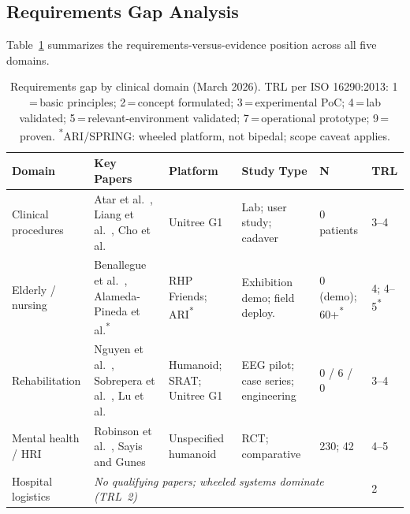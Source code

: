 \documentclass[acmsmall]{acmart}
\begin{document}
\subsection{Requirements Gap Analysis}
\label{sec:crossdomain}

Table~\ref{tab:evidence} summarizes the requirements-versus-evidence position
across all five domains.

\begin{table}[t]
  \caption{Requirements gap by clinical domain (March 2026). TRL per ISO
  16290:2013: 1\,=\,basic principles; 2\,=\,concept formulated;
  3\,=\,experimental PoC; 4\,=\,lab validated; 5\,=\,relevant-environment
  validated; 7\,=\,operational prototype; 9\,=\,proven.
  \textsuperscript{*}ARI/SPRING: wheeled platform, not bipedal; scope caveat applies.}
  \label{tab:evidence}
  \footnotesize
  \begin{tabular}{@{}p{2.1cm}p{2.1cm}p{2.0cm}p{1.4cm}p{1.1cm}l@{}}
    \toprule
    \textbf{Domain} & \textbf{Key Papers} & \textbf{Platform} & \textbf{Study Type} & \textbf{N} & \textbf{TRL} \\
    \midrule
    Clinical procedures &
      Atar et al.~\cite{atar2025humanoids}, Liang et al.~\cite{liang2025lapsurgie}, Cho et al.~\cite{cho2026humanoid} &
      Unitree G1 & Lab; user study; cadaver & 0 patients & 3--4 \\[3pt]
    Elderly / nursing &
      Benallegue et al.~\cite{benallegue2025rhp}, Alameda-Pineda et al.\textsuperscript{*}~\cite{alamedapineda2024spring} &
      RHP Friends; ARI\textsuperscript{*} & Exhibition demo; field deploy. &
      0 (demo); 60+\textsuperscript{*} & 4; 4--5\textsuperscript{*} \\[3pt]
    Rehabilitation &
      Nguyen et al.~\cite{nguyen2024eeg}, Sobrepera et al.~\cite{sobrepera2022feasibility}, Lu et al.~\cite{lu2025gentlehumanoid} &
      Humanoid; SRAT; Unitree G1 & EEG pilot; case series; engineering &
      0 / 6 / 0 & 3--4 \\[3pt]
    Mental health / HRI &
      Robinson et al.~\cite{robinson2023brief}, Sayis and Gunes~\cite{sayis2024technology} &
      Unspecified humanoid & RCT; comparative & 230; 42 & 4--5 \\[3pt]
    Hospital logistics & \multicolumn{4}{l}{\emph{No qualifying papers; wheeled systems dominate (TRL~2)}} & 2 \\
    \bottomrule
  \end{tabular}
\end{table}
\end{document}
